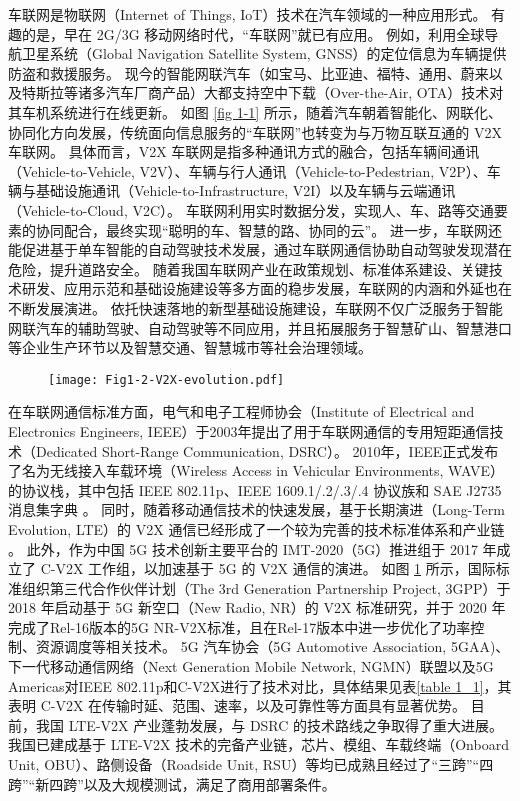 车联网是物联网（Internet of Things, IoT）技术在汽车领域的一种应用形式。
有趣的是，早在 2G/3G 移动网络时代，“车联网”就已有应用。
例如，利用全球导航卫星系统（Global Navigation Satellite System, GNSS）的定位信息为车辆提供防盗和救援服务。
现今的智能网联汽车（如宝马、比亚迪、福特、通用、蔚来以及特斯拉等诸多汽车厂商产品）大都支持空中下载（Over-the-Air, OTA）技术对其车机系统进行在线更新。
如图 \ref{fig 1-1} 所示，随着汽车朝着智能化、网联化、协同化方向发展，传统面向信息服务的“车联网”也转变为与万物互联互通的 V2X 车联网。
具体而言，V2X 车联网是指多种通讯方式的融合，包括车辆间通讯（Vehicle-to-Vehicle, V2V）、车辆与行人通讯（Vehicle-to-Pedestrian, V2P）、车辆与基础设施通讯（Vehicle-to-Infrastructure, V2I）以及车辆与云端通讯（Vehicle-to-Cloud, V2C）。
车联网利用实时数据分发，实现人、车、路等交通要素的协同配合，最终实现“聪明的车、智慧的路、协同的云”。
进一步，车联网还能促进基于单车智能的自动驾驶技术发展，通过车联网通信协助自动驾驶发现潜在危险，提升道路安全。
随着我国车联网产业在政策规划、标准体系建设、关键技术研发、应用示范和基础设施建设等多方面的稳步发展，车联网的内涵和外延也在不断发展演进。
依托快速落地的新型基础设施建设，车联网不仅广泛服务于智能网联汽车的辅助驾驶、自动驾驶等不同应用，并且拓展服务于智慧矿山、智慧港口等企业生产环节以及智慧交通、智慧城市等社会治理领域\cite{zhong2021che}。

\begin{figure}[h]
	\centering
\texttt{[image: Fig1-2-V2X-evolution.pdf]}
	\label{fig 1-2}
\end{figure}

在车联网通信标准方面，电气和电子工程师协会（Institute of Electrical and Electronics Engineers, IEEE）于2003年提出了用于车联网通信的专用短距通信技术（Dedicated Short-Range Communication, DSRC）。
2010年，IEEE正式发布了名为无线接入车载环境（Wireless Access in Vehicular Environments, WAVE）的协议栈，其中包括 IEEE 802.11p、IEEE 1609.1/.2/.3/.4 协议族和 SAE J2735消息集字典 \cite{wu2013vehicular}。
同时，随着移动通信技术的快速发展，基于长期演进（Long-Term Evolution, LTE）的 V2X 通信已经形成了一个较为完善的技术标准体系和产业链 \cite{chen2016lte}。
此外，作为中国 5G 技术创新主要平台的 IMT-2020（5G）推进组于 2017 年成立了 C-V2X 工作组，以加速基于 5G 的 V2X 通信的演进。
如图 \ref{fig 1-2} 所示，国际标准组织第三代合作伙伴计划（The 3rd Generation Partnership Project, 3GPP）于 2018 年启动基于 5G 新空口（New Radio, NR）的 V2X 标准研究，并于 2020 年完成了Rel-16版本的5G NR-V2X标准\cite{saad2021advancements}，且在Rel-17版本中进一步优化了功率控制、资源调度等相关技术。
5G 汽车协会（5G Automotive Association, 5GAA)、下一代移动通信网络（Next Generation Mobile Network, NGMN）联盟以及5G Americas对IEEE 802.11p和C-V2X进行了技术对比，具体结果见表\ref{table 1_1}，其表明 C-V2X 在传输时延、范围、速率，以及可靠性等方面具有显著优势。
目前，我国 LTE-V2X 产业蓬勃发展，与 DSRC 的技术路线之争取得了重大进展。
我国已建成基于 LTE-V2X 技术的完备产业链，芯片、模组、车载终端（Onboard Unit, OBU）、路侧设备（Roadside Unit, RSU）等均已成熟且经过了“三跨”“四跨”“新四跨”以及大规模测试，满足了商用部署条件。

